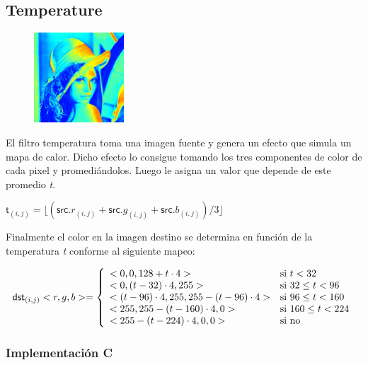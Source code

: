 \subsection{Temperature}

\begin{figure}
	\centering
	\includegraphics[width=0.3\textwidth]{imagenes/lenaTEMP.jpg}
\end{figure}

El filtro temperatura toma una imagen fuente y genera un efecto que simula un mapa de calor. Dicho efecto lo consigue tomando los tres componentes de color de cada pixel y promediándolos. Luego le asigna un valor que depende de este promedio \textit{t}.

\begin{center}
$\mathsf{t}_{(i,j)} = \lfloor(\mathsf{src}.r_{(i,j)} + \mathsf{src}.g_{(i,j)} + \mathsf{src}.b_{(i,j)}) / 3\rfloor$
\end{center}

Finalmente el color en la imagen destino se determina en función de la temperatura \textit{t} conforme al siguiente mapeo:

\begin{center}
\begin{displaymath}
\mathsf{dst}_{(i,j)}<r,g,b> = \left\{
\begin{array}{l l}
			<0,0, 128 + t \cdot 4> & \text{si }t < 32\\
			<0, (t - 32) \cdot 4, 255> & \text{si }32 \le t < 96\\
			<(t-96) \cdot 4, 255, 255 - (t-96) \cdot 4> & \text{si }96 \le t < 160\\
			<255, 255 - (t - 160) \cdot 4, 0> & \text{si }160 \le t < 224\\
			<255 - (t - 224) \cdot 4, 0 , 0> & \text{si no} \\
\end{array}
\right.
\end{displaymath}
\end{center}

\hfill
\subsubsection{Implementación C}

